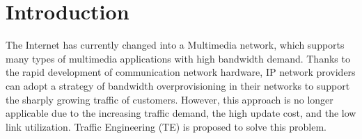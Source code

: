 \documentclass[10pt,conference]{IEEEtran}
\begin{document}
\section{Introduction}
The Internet has currently changed into a Multimedia network, which supports many types of multimedia applications with high bandwidth demand. Thanks to the rapid development of communication network hardware, IP network providers can adopt a strategy of bandwidth overprovisioning in their networks to support the sharply growing traffic of customers\cite{TE-survey2008}. However, this approach is no longer applicable due to the increasing traffic demand, the high update cost, and the low link utilization. Traffic Engineering (TE) is proposed to solve this problem.
\end{document}

